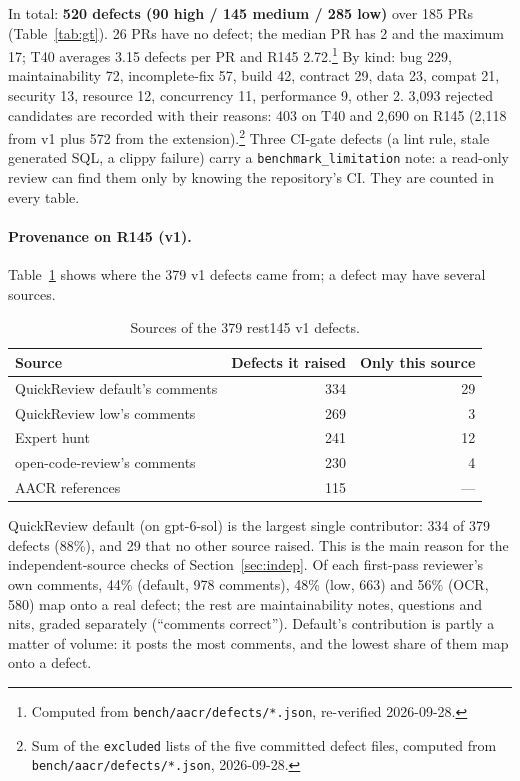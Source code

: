 \documentclass[11pt,a4paper]{article}
\newcommand{\qcr}{QuickReview}
\newcommand{\code}[1]{\texttt{#1}}
\begin{document}
In total: \textbf{520 defects (90 high / 145 medium / 285 low)} over 185 PRs
(Table~\ref{tab:gt}). 26 PRs have no defect; the median PR has 2 and the
maximum 17; T40 averages 3.15 defects per PR and R145
2.72.\footnote{Computed from \code{bench/aacr/defects/*.json}, re-verified
2026-09-28.} By kind: bug 229, maintainability 72, incomplete-fix 57, build
42, contract 29, data 23, compat 21, security 13, resource 12, concurrency
11, performance 9, other 2. 3{,}093 rejected candidates are recorded with
their reasons: 403 on T40 and 2{,}690 on R145 (2{,}118 from v1 plus 572 from
the extension).\footnote{Sum of the \code{excluded} lists of the five
committed defect files, computed from \code{bench/aacr/defects/*.json},
2026-09-28.} Three CI-gate defects (a lint rule, stale generated SQL, a
clippy failure) carry a \code{benchmark\_limitation} note: a read-only
review can find them only by knowing the repository's CI. They are counted
in every table.

\paragraph{Provenance on R145 (v1).} Table~\ref{tab:prov} shows where the
379 v1 defects came from; a defect may have several sources.

\begin{table}[tbp]
  \centering
  \caption{Sources of the 379 rest145 v1 defects.}
  \label{tab:prov}
  \begin{tabular}{lrr}
    \toprule
    Source & Defects it raised & Only this source \\
    \midrule
    \qcr{} default's comments & 334 & 29 \\
    \qcr{} low's comments & 269 & 3 \\
    Expert hunt & 241 & 12 \\
    open-code-review's comments & 230 & 4 \\
    AACR references & 115 & --- \\
    \bottomrule
  \end{tabular}
\end{table}

\qcr{} default (on gpt-6-sol) is the largest single contributor: 334 of 379
defects (88\%), and 29 that no other source raised. This is the main reason
for the independent-source checks of Section~\ref{sec:indep}. Of each
first-pass reviewer's own comments, 44\% (default, 978 comments), 48\% (low,
663) and 56\% (OCR, 580) map onto a real defect; the rest are maintainability
notes, questions and nits, graded separately (``comments correct''). Default's
contribution is partly a matter of volume: it posts the most comments, and
the lowest share of them map onto a defect.
\end{document}
